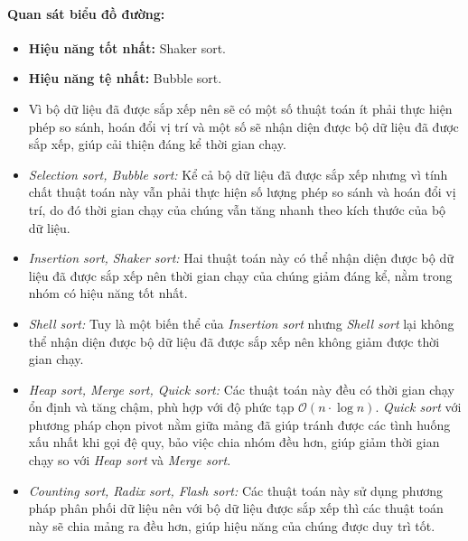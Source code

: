     \paragraph{Quan sát biểu đồ đường:}
    \begin{itemize}
        \item \textbf{Hiệu năng tốt nhất:} Shaker sort.
        \item \textbf{Hiệu năng tệ nhất:} Bubble sort.
        \item Vì bộ dữ liệu đã được sắp xếp nên sẽ có một số thuật toán ít phải thực hiện phép so sánh, hoán đổi vị trí và một số sẽ nhận diện được bộ dữ liệu đã được sắp xếp, giúp cải thiện đáng kể thời gian chạy.
        \item \textit{Selection sort, Bubble sort: } Kể cả bộ dữ liệu đã được sắp xếp nhưng vì tính chất thuật toán này vẫn phải thực hiện số lượng phép so sánh và hoán đổi vị trí, do đó thời gian chạy của chúng vẫn tăng nhanh theo kích thước của bộ dữ liệu.
        \item \textit{Insertion sort, Shaker sort: } Hai thuật toán này có thể nhận diện được bộ dữ liệu đã được sắp xếp nên thời gian chạy của chúng giảm đáng kể, nằm trong nhóm có hiệu năng tốt nhất.
        \item \textit{Shell sort: } Tuy là một biến thể của \textit{Insertion sort} nhưng \textit{Shell sort} lại không thể nhận diện được bộ dữ liệu đã được sắp xếp nên không giảm được thời gian chạy.
        \item \textit{Heap sort, Merge sort, Quick sort:} Các thuật toán này đều có thời gian chạy ổn định và tăng chậm, phù hợp với độ phức tạp $\mathcal{O}(n \cdot \log n)$. \textit{Quick sort} với phương pháp chọn pivot nằm giữa mảng đã giúp tránh được các tình huống xấu nhất khi gọi đệ quy, bảo việc chia nhóm đều hơn, giúp giảm thời gian chạy so với \textit{Heap sort} và \textit{Merge sort}.
        \item \textit{Counting sort, Radix sort, Flash sort:} Các thuật toán này sử dụng phương pháp phân phối dữ liệu nên với bộ dữ liệu được sắp xếp thì các thuật toán này sẽ chia mảng ra đều hơn, giúp hiệu năng của chúng được duy trì tốt.
    \end{itemize}    

\newpage

